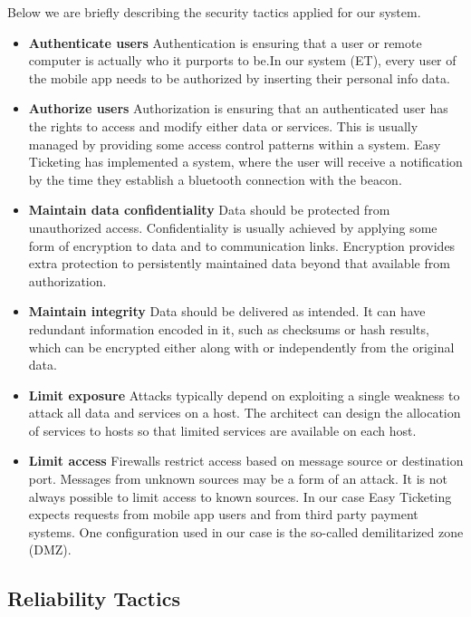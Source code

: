 Below we are briefly describing the security tactics applied for our system.
\begin{itemize} 

\item \textbf{Authenticate users}
Authentication is ensuring that a user or remote computer is actually who it purports to be.In our system (ET), every user of the mobile app needs to be authorized by inserting their personal info data. 

\item \textbf{Authorize users}
Authorization is ensuring that an authenticated user has the rights to access and modify either data or services. This is usually managed by providing some access control patterns within a system. Easy Ticketing has implemented a system, where the user will receive a notification by the time they establish a bluetooth connection with the beacon.

\item \textbf{Maintain data confidentiality} 
Data should be protected from unauthorized access. Confidentiality is usually achieved by applying some form of encryption to data and to communication links. Encryption provides extra protection to persistently maintained data beyond that available from authorization. 

\item \textbf{Maintain integrity} Data should be delivered as intended. It can have redundant information encoded in it, such as checksums or hash results, which can be encrypted either along with or independently from the original data.

\item \textbf{Limit exposure} Attacks typically depend on exploiting a single weakness to attack all data and services on a host. The architect can design the allocation of services to hosts so that limited services are available on each host.

\item \textbf{Limit access} Firewalls restrict access based on message source or destination port. Messages from unknown sources may be a form of an attack. It is not always possible to limit access to known sources. In our case Easy Ticketing  expects requests from mobile app users and from third party payment systems.  One configuration used in our case is the so-called demilitarized zone (DMZ). 
\end{itemize} 



\subsection{Reliability Tactics}